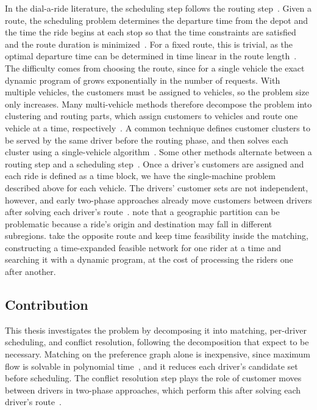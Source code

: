 In the dial-a-ride literature, the scheduling step follows the routing step~\citep{cordeau2007dialaride,savelsbergh1995general}. Given a route, the scheduling problem determines the departure time from the depot and the time the ride begins at each stop so that the time constraints are satisfied and the route duration is minimized~\citep{cordeau2007dialaride}. For a fixed route, this is trivial, as the optimal departure time can be determined in time linear in the route length~\citep {cordeau2007dialaride}. The difficulty comes from choosing the route, since for a single vehicle the exact dynamic program of \citet{psaraftis1980dynamic} grows exponentially in the number of requests. With multiple vehicles, the customers must be assigned to vehicles, so the problem size only increases. Many multi-vehicle methods therefore decompose the problem into clustering and routing parts, which assign customers to vehicles and route one vehicle at a time, respectively~\citep{savelsbergh1995general,cordeau2007dialaride}. A common technique defines customer clusters to be served by the same driver before the routing phase, and then solves each cluster using a single-vehicle algorithm~\citep{cordeau2007dialaride,savelsbergh1995general}. Some other methods alternate between a routing step and a scheduling step~\citep{cordeau2007dialaride,savelsbergh1995general}. Once a driver's customers are assigned and each ride is defined as a time block, we have the single-machine problem described above for each vehicle. The drivers' customer sets are not independent, however, and early two-phase approaches already move customers between drivers after solving each driver's route~\citep{cordeau2007dialaride}. \citet{agatz2012optimization} note that a geographic partition can be problematic because a ride's origin and destination may fall in different subregions. \citet{masoud2017realtime} take the opposite route and keep time feasibility inside the matching, constructing a time-expanded feasible network for one rider at a time and searching it with a dynamic program, at the cost of processing the riders one after another.

\subsection{Contribution}

This thesis investigates the problem by decomposing it into matching, per-driver scheduling, and conflict resolution, following the decomposition that \citet{agatz2012optimization} expect to be necessary. Matching on the preference graph alone is inexpensive, since maximum flow is solvable in polynomial time~\citep{edmonds1972theoretical}, and it reduces each driver's candidate set before scheduling. The conflict resolution step plays the role of customer moves between drivers in two-phase approaches, which perform this after solving each driver's route~\citep{cordeau2007dialaride}.

